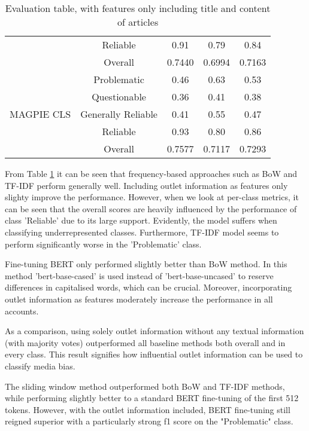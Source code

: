 \begin{table}[htbp]
\begin{tabular}{| c | c | c | c | c |}
                                                 & Reliable           & 0.91      & 0.79   & 0.84   \\
                                                 & Overall            & 0.7440    & 0.6994 & 0.7163 \\
        \hline
        \multirow{5}{*}{MAGPIE CLS}              & Problematic        & 0.46      & 0.63   & 0.53   \\
                                                 & Questionable       & 0.36      & 0.41   & 0.38   \\
                                                 & Generally Reliable & 0.41      & 0.55   & 0.47   \\
                                                 & Reliable           & 0.93      & 0.80   & 0.86   \\
                                                 & Overall            & 0.7577    & 0.7117 & 0.7293 \\
        \hline
    \end{tabular}
    \caption{Evaluation table, with features only including title and content of articles}
    \label{table:eval}
\end{table}



From Table \ref{table:eval} it can be seen that frequency-based approaches such as BoW and TF-IDF perform generally well. Including outlet information as features only slighty improve the performance. However, when we look at per-class metrics, it can be seen that the overall scores are heavily influenced by the performance of class 'Reliable' due to its large support. Evidently, the model suffers when classifying underrepresented classes. Furthermore, TF-IDF model seems to perform significantly worse in the 'Problematic' class.

Fine-tuning BERT only performed slightly better than BoW method. In this method 'bert-base-cased' is used instead of 'bert-base-uncased' to reserve differences in capitalised words, which can be crucial. Moreover, incorporating outlet information as features moderately increase the performance in all accounts.

As a comparison, using solely outlet information without any textual information (with majority votes) outperformed all baseline methods both overall and in every class. This result signifies how influential outlet information can be used to classify media bias.


The sliding window method outperformed both BoW and TF-IDF methods, while performing slightly better to a standard BERT fine-tuning of the first 512 tokens. However, with the outlet information included, BERT fine-tuning still reigned superior with a particularly strong f1 score on the "Problematic" class.

